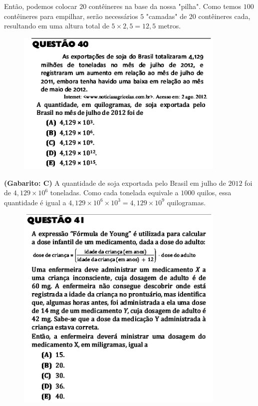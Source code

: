 \documentclass[a4paper]{article}
\begin{document}
\par\vspace{0.3cm} Então, podemos colocar $20$ contêineres na base da nossa "pilha". Como temos $100$ contêineres para empilhar, serão necessários $5$ "camadas" de $20$ contêineres cada, resultando em uma altura total de $5\times 2,5 = 12,5$ metros.
\begin{figure}[H]
	\begin{center}
		\includegraphics[width=10cm]{L2Q40.png}
	\end{center}
\end{figure}
\par\textbf{(Gabarito: C)} A quantidade de soja exportada pelo Brasil em julho de $2012$ foi de $4,129\times 10^6$ toneladas. Como cada tonelada equivale a $1000$ quilos, essa quantidade é igual a $4,129\times 10^6\times 10^3 = 4,129\times 10^9$ quilogramas.
\begin{figure}[H]
	\begin{center}
		\includegraphics[width=10cm]{L2Q41.png}
	\end{center}
\end{figure}
\end{document}
